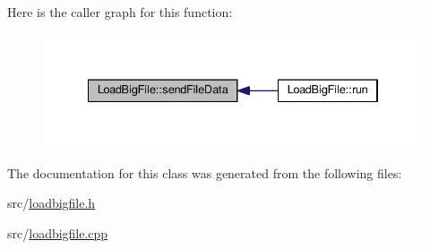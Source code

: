 Here is the caller graph for this function\+:
\nopagebreak
\begin{figure}[H]
\begin{center}
\leavevmode
\includegraphics[width=334pt]{classLoadBigFile_ad0c00cd9faeeb4e03a94f530152c69d9_icgraph}
\end{center}
\end{figure}




The documentation for this class was generated from the following files\+:\begin{DoxyCompactItemize}
\item 
src/\hyperlink{loadbigfile_8h}{loadbigfile.\+h}\item 
src/\hyperlink{loadbigfile_8cpp}{loadbigfile.\+cpp}\end{DoxyCompactItemize}

